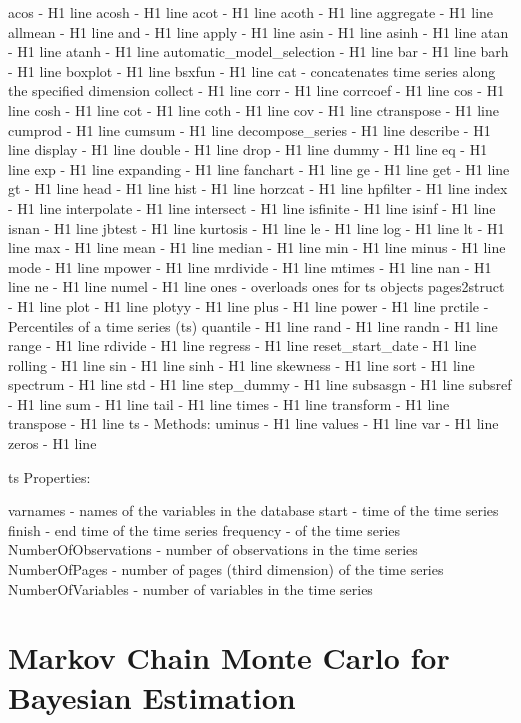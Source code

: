 \documentclass[letterpaper,10pt,english]{sphinxmanual}
\begin{document}
acos -   H1 line
acosh -   H1 line
acot -   H1 line
acoth -   H1 line
aggregate -   H1 line
allmean -   H1 line
and -   H1 line
apply -   H1 line
asin -   H1 line
asinh -   H1 line
atan -   H1 line
atanh -   H1 line
automatic\_model\_selection -   H1 line
bar -   H1 line
barh -   H1 line
boxplot -   H1 line
bsxfun -   H1 line
cat - concatenates time series along the specified dimension
collect -   H1 line
corr -   H1 line
corrcoef -   H1 line
cos -   H1 line
cosh -   H1 line
cot -   H1 line
coth -   H1 line
cov -   H1 line
ctranspose -   H1 line
cumprod -   H1 line
cumsum -   H1 line
decompose\_series -   H1 line
describe -   H1 line
display -   H1 line
double -   H1 line
drop -   H1 line
dummy -   H1 line
eq -   H1 line
exp -   H1 line
expanding -   H1 line
fanchart -   H1 line
ge -   H1 line
get -   H1 line
gt -   H1 line
head -   H1 line
hist -   H1 line
horzcat -   H1 line
hpfilter -   H1 line
index -   H1 line
interpolate -   H1 line
intersect -   H1 line
isfinite -   H1 line
isinf -   H1 line
isnan -   H1 line
jbtest -   H1 line
kurtosis -   H1 line
le -   H1 line
log -   H1 line
lt -   H1 line
max -   H1 line
mean -   H1 line
median -   H1 line
min -   H1 line
minus -   H1 line
mode -   H1 line
mpower -   H1 line
mrdivide -   H1 line
mtimes -   H1 line
nan -   H1 line
ne -   H1 line
numel -   H1 line
ones - overloads ones for ts objects
pages2struct -   H1 line
plot -   H1 line
plotyy -   H1 line
plus -   H1 line
power -   H1 line
prctile - Percentiles of a time series (ts)
quantile -   H1 line
rand -   H1 line
randn -   H1 line
range -   H1 line
rdivide -   H1 line
regress -   H1 line
reset\_start\_date -   H1 line
rolling -   H1 line
sin -   H1 line
sinh -   H1 line
skewness -   H1 line
sort -   H1 line
spectrum -   H1 line
std -   H1 line
step\_dummy -   H1 line
subsasgn -   H1 line
subsref -   H1 line
sum -   H1 line
tail -   H1 line
times -   H1 line
transform -   H1 line
transpose -   H1 line
ts - Methods:
uminus -   H1 line
values -   H1 line
var -   H1 line
zeros -   H1 line

ts  Properties:

varnames -   names of the variables in the database
start - time of the time series
finish -   end time of the time series
frequency - of the time series
NumberOfObservations -   number of observations in the time series
NumberOfPages -   number of pages (third dimension) of the time series
NumberOfVariables -   number of variables in the time series


\chapter{Markov Chain Monte Carlo for Bayesian Estimation}
\label{mcmc::doc}\label{mcmc:markov-chain-monte-carlo-for-bayesian-estimation}
\end{document}
